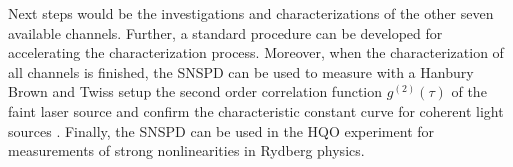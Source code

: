 Next steps would be the investigations and characterizations of the other seven available channels.
Further, a standard procedure can be developed for accelerating the characterization process.
Moreover, when the characterization of all channels is finished, the SNSPD can be used to measure with a Hanbury Brown and
Twiss setup the second order correlation function $g^{(2)}(\tau)$ of the faint laser source and confirm
the characteristic constant curve for coherent light sources \cite{glauber-1963}.
Finally, the SNSPD can be used in the HQO experiment for measurements of strong nonlinearities in Rydberg physics.


